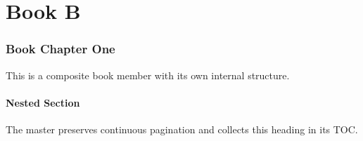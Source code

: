 \documentclass[master.tex]{subfiles}
\begin{document}
\part{Book B}
\section{Book Chapter One}
This is a composite book member with its own internal structure.
\subsection{Nested Section}
The master preserves continuous pagination and collects this heading in its TOC.
\end{document}
